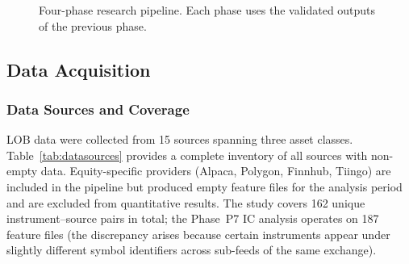 \documentclass[12pt,a4paper]{article}
\theoremstyle{definition}
\theoremstyle{remark}
\begin{document}
\begin{figure}[H]
\centering
{}
\caption{Four-phase research pipeline. Each phase uses the validated
outputs of the previous phase.}
\label{fig:pipeline}
\end{figure}

\subsection{Data Acquisition}
\label{sec:data}

\subsubsection{Data Sources and Coverage}

LOB data were collected from 15 sources spanning three asset classes.
Table~\ref{tab:datasources} provides a complete inventory of all
sources with non-empty data. Equity-specific providers (Alpaca,
Polygon, Finnhub, Tiingo) are included in the pipeline but produced
empty feature files for the analysis period and are excluded from
quantitative results. The study covers 162 unique instrument--source
pairs in total; the Phase~P7 IC analysis operates on 187 feature
files (the discrepancy arises because certain instruments appear
under slightly different symbol identifiers across sub-feeds of
the same exchange).
\end{document}

